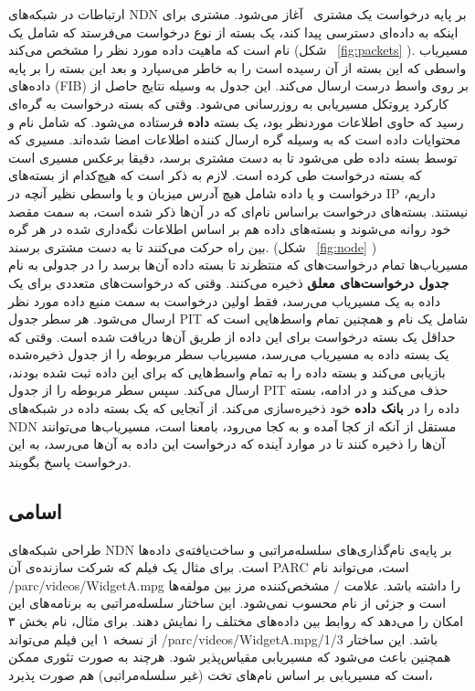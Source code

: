 ارتباطات در شبکه‌های NDN بر پایه درخواست یک مشتری
\
 آغاز می‌شود. مشتری برای اینکه به داده‌ای دسترسی پیدا کند، یک بسته از نوع درخواست می‌فرستد که شامل یک نام است که ماهیت داده مورد نظر را مشخص می‌کند (شکل
‍‍‍‍~\ref{fig:packets}
). مسیریاب واسطی که این بسته از آن رسیده است را به خاطر می‌سپارد و بعد این بسته را بر پایه داده‌های  (FIB) بر روی واسط درست ارسال می‌کند. این جدول به وسیله نتایج حاصل از کارکرد پروتکل مسیریابی به روزرسانی می‌شود. وقتی که بسته درخواست به گره‌ای رسید که حاوی اطلاعات موردنظر بود، یک بسته \textbf{داده} فرستاده می‌شود. که شامل نام و محتوایات داده است که به وسیله گره ارسال کننده اطلاعات امضا شده‌اند. مسیری که توسط بسته داده طی می‌شود تا به دست مشتری برسد، دقیقا برعکس مسیری است که بسته درخواست طی کرده است. لازم به ذکر است که هیچ‌کدام از بسته‌‌های درخواست و یا داده شامل هیچ آدرس میزبان و یا واسطی نظیر آنچه در IP  داریم، نیستند. بسته‌های درخواست براساس نام‌ای که در آن‌ها ذکر شده است، به سمت مقصد خود روانه می‌شوند و بسته‌های داده هم بر اساس اطلاعات نگه‌داری شده در هر گره بین راه حرکت می‌کنند تا به دست مشتری برسند. (‌شکل
~\ref{fig:node}
) \\
مسیریاب‌ها تمام درخواست‌‌های که منتظرند تا بسته داده آن‌ها برسد را در جدولی به نام \textbf{جدول درخواست‌‌های معلق} ذخیره‌ می‌کنند. وقتی که درخواست‌‌‌های متعددی برای یک داده به یک مسیریاب می‌رسد، فقط اولین درخواست به سمت منبع داده مورد نظر ارسال می‌شود. هر سطر جدول PIT شامل یک نام و همچنین تمام واسط‌‌هایی است که حداقل یک بسته درخواست برای این داده از طریق آن‌ها دریافت شده است. وقتی که یک بسته داده به مسیریاب می‌رسد، مسیریاب سطر مربوطه را از جدول ذخیره‌شده بازیابی می‌کند و بسته داده را به تمام واسط‌هایی که برای این داده ثبت شده بودند، ارسال می‌کند. سپس سطر مربوطه را از جدول PIT  حذف می‌کند و در ادامه، بسته داده را در \textbf{بانک داده} خود ذخیره‌سازی می‌کند. از آنجایی که یک بسته داده در شبکه‌های NDN مستقل از آنکه از کجا آمده و به کجا می‌رود، بامعنا است، مسیریاب‌ها می‌توانند آن‌ها را ذخیره کنند تا در موارد آینده که درخواست این داده به آن‌ها می‌رسد، به این درخواست پاسخ بگویند. 




\subsection{اسامی}
طراحی شبکه‌های NDN بر پایه‌ی نام‌گذاری‌های سلسله‌مراتبی و ساخت‌یافته‌ی داده‌ها است. برای مثال یک فیلم که شرکت سازنده‌ی آن PARC است، می‌تواند نام /parc/videos/WidgetA.mpg را داشته باشد. علامت / مشخص‌کننده مرز بین مولفه‌ها است و جزئی از نام محسوب نمی‌شود. این ساختار سلسله‌مراتبی به برنامه‌های این امکان را می‌دهد که روابط بین داده‌های مختلف را نمایش دهند. برای مثال، نام بخش ۳ از نسخه ۱ این فیلم می‌تواند /parc/videos/WidgetA.mpg/1/3 باشد. این ساختار همچنین باعث می‌شود که مسیریابی مقیاس‌پذیر شود. هرچند به صورت تئوری ممکن است که مسیریابی بر اساس نام‌های تخت (غیر سلسله‌مراتبی) هم صورت پذیرد،

